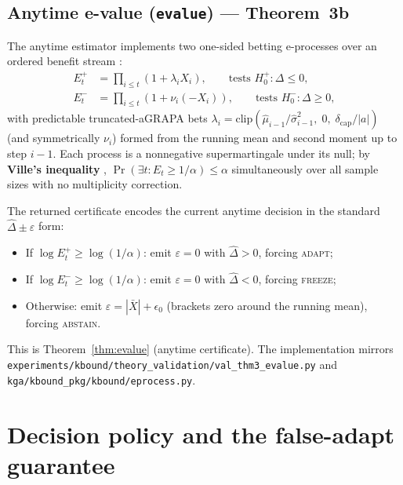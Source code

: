 \subsection{Anytime e-value (\texttt{evalue}) --- Theorem~3b}
\label{sec:kga-evalue}

The anytime estimator implements two one-sided betting e-processes over an
ordered benefit stream \cite{ville1939etude,waudbysmith2024betting}:
\begin{align}
  E_t^+ &= \prod_{i \leq t} (1 + \lambda_i X_i), \qquad
  \text{tests } H_0^+: \Delta \leq 0,
  \label{eq:eplus}\\
  E_t^- &= \prod_{i \leq t} (1 + \nu_i(-X_i)), \qquad
  \text{tests } H_0^-: \Delta \geq 0,
  \label{eq:eminus}
\end{align}
with predictable truncated-aGRAPA bets
$\lambda_i = \mathrm{clip}(\widehat\mu_{i-1}/\widehat\sigma^2_{i-1},\;0,\;
\delta_{\mathrm{cap}}/|a|)$ (and symmetrically $\nu_i$) formed from
the running mean and second moment up to step $i-1$.  Each process is a
nonnegative supermartingale under its null; by \textbf{Ville's inequality}
\cite{ville1939etude}, $\Pr(\exists t: E_t \geq 1/\alpha) \leq \alpha$
simultaneously over all sample sizes with no multiplicity correction.

The returned certificate encodes the current anytime decision in the standard
$\widehat\Delta \pm \varepsilon$ form:
\begin{itemize}
  \item If $\log E_t^+ \geq \log(1/\alpha)$: emit $\varepsilon = 0$ with
    $\widehat\Delta > 0$, forcing \textsc{adapt};
  \item If $\log E_t^- \geq \log(1/\alpha)$: emit $\varepsilon = 0$ with
    $\widehat\Delta < 0$, forcing \textsc{freeze};
  \item Otherwise: emit $\varepsilon = |\bar{X}| + \epsilon_0$ (brackets zero
    around the running mean), forcing \textsc{abstain}.
\end{itemize}
This is Theorem~\ref{thm:evalue} (anytime certificate).  The implementation
mirrors \texttt{experiments/kbound/theory\_validation/val\_thm3\_evalue.py} and
\texttt{kga/kbound\_pkg/kbound/eprocess.py}.

\section{Decision policy and the false-adapt guarantee}
\label{sec:kga-policy}

